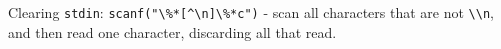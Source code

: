 Clearing \verb|stdin|: \verb|scanf("\%*[^\n]\%*c")| - scan all characters that are not \verb|\\n|, and then read one character, discarding all that read.
